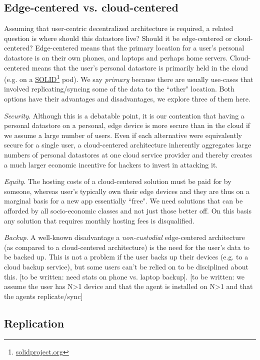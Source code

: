 \documentclass[11pt, oneside]{article}   	%
\newcommand{\hyperfootnote}[1][]{\def\ArgI{{#1}}\hyperfootnoteRelay}
\newcommand\hyperfootnoteRelay[2][]{\href{#1#2}{\ArgI}\footnote{\href{#1#2}{#2}}}
\begin{document}
\subsection{Edge-centered vs. cloud-centered}
Assuming that user-centric decentralized architecture is required, a related question is where should this datastore live? Should it be edge-centered or cloud-centered? Edge-centered means that the primary location for a user's personal datastore is on their own phones, and laptops and perhaps home servers. Cloud-centered means that the user's personal datastore is primarily held in the cloud (e.g. on a \hyperfootnote[SOLID][https://]{solidproject.org} pod). We say \emph{primary} because there are usually use-cases that involved replicating/syncing some of the data to the ``other" location. Both options have their advantages and disadvantages, we explore three of them here.

\emph{Security}. Although this is a debatable point, it is our contention that having a personal datastore on a personal, edge device is more secure than in the cloud if we assume a large number of users. Even if each  alternative were equivalently secure for a single user, a cloud-centered architecture inherently aggregates large numbers of personal datastores at one cloud service provider and thereby creates a much larger economic incentive for hackers to invest in attacking it. 

\emph{Equity}. The hosting costs of a cloud-centered solution must be paid for by someone, whereas user's typically own their edge devices and they are thus on a marginal basis for a new app essentially ``free". We need solutions that can be afforded by all socio-economic classes and not just those better off. On this basis any solution that requires monthly hosting fees is disqualified.

\emph{Backup}. A well-known disadvantage a \emph{non-custodial} edge-centered architecture (as compared to a cloud-centered architecture) is the need for the user's data to be backed up. This is not a problem if the user backs up their devices (e.g. to a cloud backup service), but some users can't be relied on to be disciplined about this. [to be written: need stats on phone vs. laptop backup]. [to be written: we assume the user has N>1 device and that the agent is installed on N>1 and that the agents replicate/sync]

\subsection{Replication}
\end{document}
